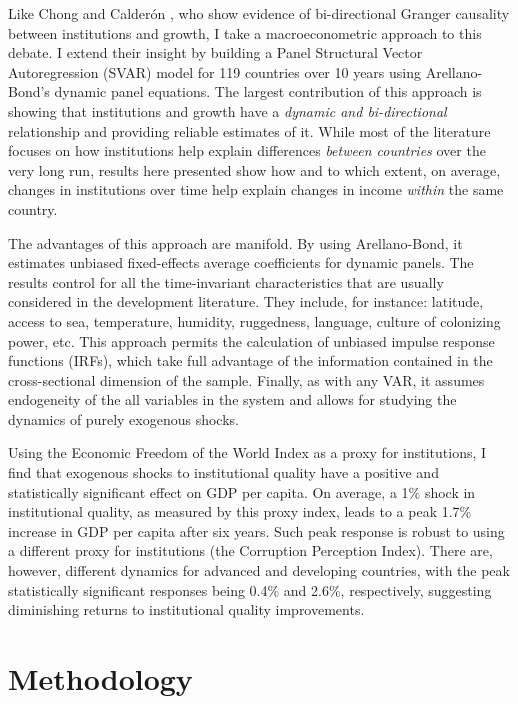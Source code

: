 \documentclass{article}
\begin{document}
Like Chong and Calderón \parencite*{cc}, who show evidence of bi-directional Granger causality between institutions and growth, I take a macroeconometric approach to this debate. I extend their insight by building a Panel Structural Vector Autoregression (SVAR) model for 119 countries over 10 years using Arellano-Bond's dynamic panel equations. The largest contribution of this approach is showing that institutions and growth have a \textit{dynamic and bi-directional} relationship and providing reliable estimates of it. While most of the literature focuses on how institutions help explain differences \textit{between countries} over the very long run, results here presented show how and to which extent, on average, changes in institutions over time help explain changes in income \textit{within} the same country.

The advantages of this approach are manifold. By using Arellano-Bond, it estimates unbiased fixed-effects average coefficients for dynamic panels. The results control for all the  time-invariant characteristics that are usually considered in the development literature. They include, for instance: latitude, access to sea, temperature, humidity, ruggedness, language, culture of colonizing power, etc. This approach permits the calculation of unbiased impulse response functions (IRFs), which take full advantage of the information contained in the cross-sectional dimension of the sample. Finally, as with any VAR, it assumes endogeneity of the all variables in the system and allows for studying the dynamics of purely exogenous shocks.

Using the Economic Freedom of the World Index as a proxy for institutions, I find that exogenous shocks to institutional quality have a positive and statistically significant effect on GDP per capita. On average, a 1\% shock in institutional quality, as measured by this proxy index, leads to a peak 1.7\% increase in GDP per capita after six years. Such peak response is robust to using a different proxy for institutions (the Corruption Perception Index). There are, however, different dynamics for advanced and developing countries, with the peak statistically significant responses being 0.4\% and 2.6\%, respectively, suggesting diminishing returns to institutional quality improvements. 

\section{Methodology}
\end{document}
